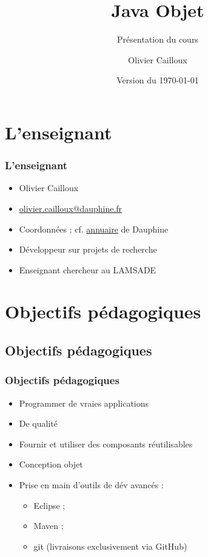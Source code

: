 \documentclass[english, french]{beamer}
\title{Java Objet}
\subtitle{Présentation du cours}
\author{Olivier Cailloux}
\institute[LAMSADE]{LAMSADE, Université Paris-Dauphine}
\date{Version du \today}
\begin{document}


\begin{frame}[plain]
   \titlepage
\end{frame}
\addtocounter{framenumber}{-1}

\section{L’enseignant}
\begin{frame}
	\frametitle{L’enseignant}
	\begin{itemize}
		\item Olivier Cailloux
		\item \href{mailto:olivier.cailloux@dauphine.fr}{olivier.cailloux@dauphine.fr}
		\item Coordonnées : cf. \href{https://annuaire.dauphine.psl.eu/annuaire/index.php?param0=fiche&param1=ocailloux}{annuaire} de Dauphine 
		\item Développeur sur projets de recherche
		\item Enseignant chercheur au LAMSADE
	\end{itemize}
\end{frame}

\section[Obj. pédagogiques]{Objectifs pédagogiques}
\subsection{Objectifs pédagogiques}
\begin{frame}
	\frametitle{Objectifs pédagogiques}
	\begin{itemize}
		\item Programmer de \og{}vraies\fg{} applications
		\item De qualité
		\item Fournir et utiliser des composants réutilisables
		\item Conception objet
		\item Prise en main d’outils de dév avancés : 
		\begin{itemize}
			\item Eclipse ;
			\item Maven ;
			\item git (livraisons exclusivement via GitHub)
		\end{itemize}
	\end{itemize}
\end{frame}
\end{document}
